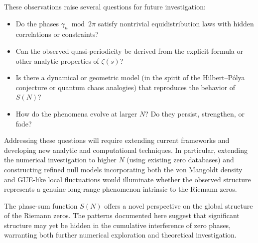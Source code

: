 \documentclass[11pt]{amsart}
\begin{document}
These observations raise several questions for future investigation:
\begin{itemize}
\item Do the phases $\gamma_n \bmod 2\pi$ satisfy nontrivial equidistribution laws with hidden correlations or constraints?
\item Can the observed quasi-periodicity be derived from the explicit formula or other analytic properties of $\zeta(s)$?
\item Is there a dynamical or geometric model (in the spirit of the Hilbert--Pólya conjecture or quantum chaos analogies) that reproduces the behavior of $S(N)$?
\item How do the phenomena evolve at larger $N$? Do they persist, strengthen, or fade?
\end{itemize}

Addressing these questions will require extending current frameworks and developing new analytic and computational techniques. 
In particular, extending the numerical investigation to higher $N$ (using existing zero databases) and constructing refined null models incorporating both the von Mangoldt density and GUE-like local fluctuations would illuminate whether the observed structure represents a genuine long-range phenomenon intrinsic to the Riemann zeros.

The phase-sum function $S(N)$ offers a novel perspective on the global structure of the Riemann zeros. 
The patterns documented here suggest that significant structure may yet be hidden in the cumulative interference of zero phases, warranting both further numerical exploration and theoretical investigation.
\end{document}
